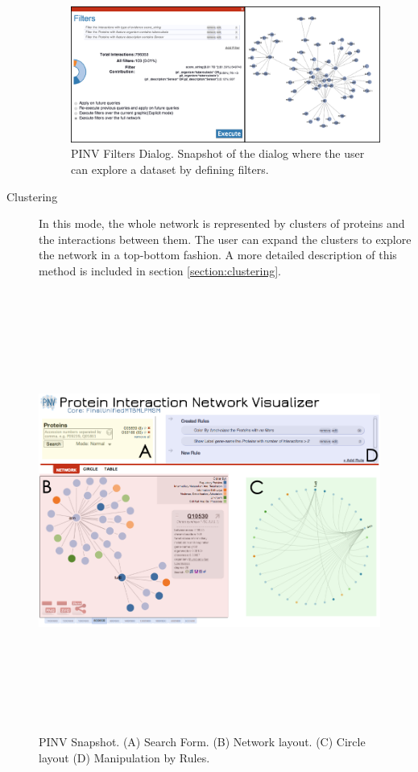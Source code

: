 \begin{description}
\begin{figure}[ht]
\centering
\includegraphics[width=\textwidth]{figures/PinvFilters.png}
\caption[PINV Filters Dialog.]{PINV Filters Dialog. Snapshot of the dialog where the user can explore a dataset by defining filters.
\label{fig:pinv_filters}}
\end{figure}

\item[Clustering] In this mode, the whole network is represented by clusters of proteins and the interactions between them. The user can expand the clusters to explore the network in a top-bottom fashion. A more detailed description of this method is included in section \ref{section:clustering}.    \end{description}

\begin{figure}  
\includegraphics[height=5.7in,angle=90]{figures/pinv.png}
\caption[PINV Snapshot.]{PINV Snapshot. (A) Search Form. (B) Network layout. (C) Circle layout (D) Manipulation by Rules.
\label{fig:pinv}}
\end{figure}

